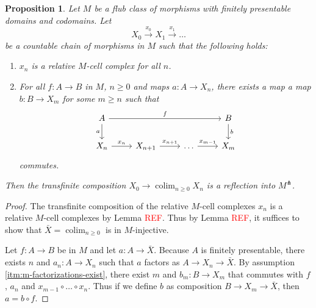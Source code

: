 \documentclass[a4paper]{article}
\newcommand{\todo}[1]{\textcolor{red}{#1}}
\newtheorem{proposition}[theorem]{Proposition}
\theoremstyle{remark}
\theoremstyle{definition}
\begin{document}
\begin{proposition}%
  \label{prop:orth-refl-constr-prop}
  Let $M$ be a flub class of morphisms with finitely presentable domains and codomains.
  Let
  \begin{equation}
    X_0 \xrightarrow{x_0} X_1 \xrightarrow{x_1} \dots
  \end{equation}
  be a countable chain of morphisms in $M$ such that the following holds:
  \begin{enumerate}
    \item
      $x_n$ is a relative $M$-cell complex for all $n$.
    \item
      \label{itm:m-factorizations-exist}
      For all $f : A \rightarrow B$ in $M$, $n \geq 0$ and maps $a : A \rightarrow X_n$, there exists a map a map $b : B \rightarrow X_m$ for some $m \geq n$ such that
      \begin{equation}
        \begin{tikzcd}
          A \arrow[rrr, "f"] \arrow[d, "a"'] & & & B \arrow[d, "b"] \\
          X_n \arrow[r, "x_n"] & X_{n + 1} \arrow[r, "x_{n + 1}"] & \dots \arrow[r, "x_{m - 1}"] & X_m
        \end{tikzcd}
      \end{equation}
      commutes.
  \end{enumerate}
  Then the transfinite composition $X_0 \rightarrow \operatorname{colim}_{n \geq 0} X_n$ is a reflection into $M^\pitchfork$.
\end{proposition}
\begin{proof}
  The transfinite composition of the relative $M$-cell complexes $x_n$ is a relative $M$-cell complexes by Lemma \todo{REF}.
  Thus by Lemma \todo{REF}, it suffices to show that $\bar X = \operatorname{colim}_{n \geq 0}$ is in $M$-injective.

  Let $f : A \rightarrow B$ be in $M$ and let $a : A \rightarrow \bar X$.
  Because $A$ is finitely presentable, there exists $n$ and $a_n : A \rightarrow X_n$ such that $a$ factors as $A \rightarrow X_n \rightarrow \bar X$.
  By assumption \ref{itm:m-factorizations-exist}, there exist $m$ and $b_m : B \rightarrow X_m$ that commutes with $f$, $a_n$ and $x_{m - 1} \circ \dots \circ x_n$.
  Thus if we define $b$ as composition $B \rightarrow X_m \rightarrow \bar X$, then $a = b \circ f$.
\end{proof}
\end{document}
